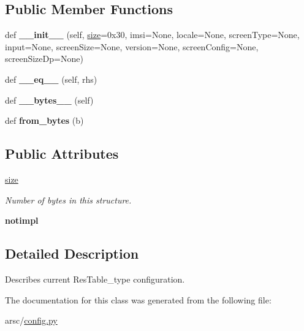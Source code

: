 \subsection*{Public Member Functions}
\begin{DoxyCompactItemize}
\item 
\mbox{\label{classconfig_1_1ResTable__config_acef4848ef7211b7e8e232d8e9fc2108d}} 
def {\bfseries \+\_\+\+\_\+init\+\_\+\+\_\+} (self, \mbox{\hyperlink{classconfig_1_1ResTable__config_a704e7305acbd458b510fb5d40ed74621}{size}}=0x30, imsi=\+None, locale=\+None, screen\+Type=\+None, input=\+None, screen\+Size=\+None, version=\+None, screen\+Config=\+None, screen\+Size\+Dp=\+None)
\item 
\mbox{\label{classconfig_1_1ResTable__config_aca175e08ab14fb7eb461c456c8eca566}} 
def {\bfseries \+\_\+\+\_\+eq\+\_\+\+\_\+} (self, rhs)
\item 
\mbox{\label{classconfig_1_1ResTable__config_a777fffb8018604f190067cb10a0314db}} 
def {\bfseries \+\_\+\+\_\+bytes\+\_\+\+\_\+} (self)
\item 
\mbox{\label{classconfig_1_1ResTable__config_a4bac07f4808ba95816ce2b4a6c85de5a}} 
def {\bfseries from\+\_\+bytes} (b)
\end{DoxyCompactItemize}
\subsection*{Public Attributes}
\begin{DoxyCompactItemize}
\item 
\mbox{\label{classconfig_1_1ResTable__config_a704e7305acbd458b510fb5d40ed74621}} 
\mbox{\hyperlink{classconfig_1_1ResTable__config_a704e7305acbd458b510fb5d40ed74621}{size}}
\begin{DoxyCompactList}\small\item\em Number of bytes in this structure. \end{DoxyCompactList}\item 
\mbox{\label{classconfig_1_1ResTable__config_a8e3fb6cbcdca8b61aba392439a979538}} 
{\bfseries notimpl}
\end{DoxyCompactItemize}


\subsection{Detailed Description}
Describes current Res\+Table\+\_\+type configuration. 

The documentation for this class was generated from the following file\+:\begin{DoxyCompactItemize}
\item 
arsc/\mbox{\hyperlink{config_8py}{config.\+py}}\end{DoxyCompactItemize}
